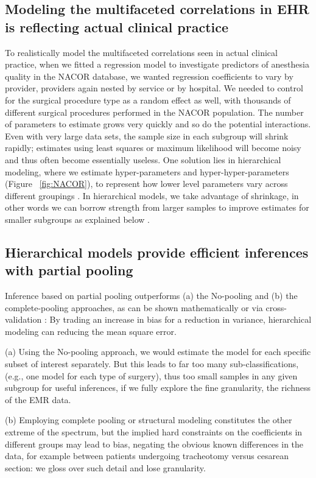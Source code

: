 \documentclass[11pt,notitlepage]{article}
\begin{document}
\subsection*{Modeling the multifaceted correlations in EHR is reflecting actual clinical practice}
To realistically model the multifaceted correlations seen in actual clinical 
practice, when we fitted a regression model to investigate predictors of 
anesthesia quality in the NACOR database, we wanted regression coefficients 
to vary by provider, providers again nested by service or by hospital\cite{AndreaeWhite2015}. We needed to control for the surgical procedure type as a 
random effect as well, with thousands of different surgical procedures performed 
in the NACOR population. The number of parameters to estimate grows very quickly 
and so do the potential interactions. Even with very large data sets, the sample 
size in each subgroup will shrink rapidly; estimates using least squares or 
maximum likelihood will become noisy and thus often become essentially useless. 
One solution lies in hierarchical modeling, where we estimate hyper-parameters 
and hyper-hyper-parameters (Figure~ \ref{fig:NACOR}), to represent how lower 
level parameters vary across different groupings \cite{Bafumi_Gelman_2007}. 
In hierarchical models, we take advantage of shrinkage, in other words we 
can borrow strength from larger samples to improve estimates for smaller 
subgroups as explained below \cite{ParkGelman2004bayesian}.

\subsection*{Hierarchical models provide efficient inferences with partial pooling}
Inference based on partial pooling outperforms (a) the No-pooling and (b) the 
complete-pooling approaches, as can be shown mathematically \cite{Efron_1975} 
or via cross-validation \cite{Gelman-Hill_2014}: By trading an increase in bias 
for a reduction in variance, hierarchical modeling can reducing the mean square error.  

(a) Using the No-pooling approach, we would estimate the model for each specific 
subset of interest separately. But this leads to far too many sub-classifications, 
(e.g., one model for each type of surgery), thus too small samples in any given 
subgroup for useful inferences, if we fully explore the fine granularity, the 
richness of the EMR data. 

(b) Employing complete pooling or structural modeling constitutes the other extreme 
of the spectrum, but the implied hard constraints on the coefficients in different 
groups may lead to bias, negating the obvious known differences in the data, for 
example between patients undergoing tracheotomy versus cesarean section: we gloss 
over such detail and lose granularity. 
\end{document}
